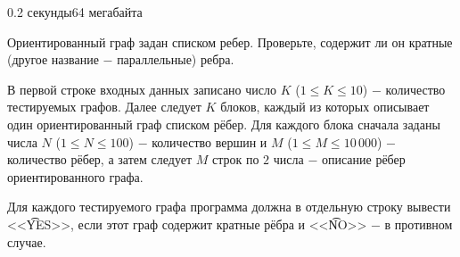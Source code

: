 \begin{problem}{}{}{}{0.2 секунды}{64 мегабайта}

Ориентированный граф задан списком ребер. 
Проверьте, содержит ли он кратные (другое название $-$ параллельные) ребра.

\InputFile
В первой строке входных данных записано число $K$ ($1 \le K \le 10$) $-$ количество тестируемых графов. 
Далее следует $K$ блоков, каждый из которых описывает один ориентированный граф списком рёбер. 
Для каждого блока сначала заданы числа $N$ ($1 \le N \le 100$) $-$ количество вершин и $M$ ($1 \le M \le 10\,000$) $-$
количество рёбер, а затем следует $M$ строк по $2$ числа $-$ описание рёбер ориентированного графа.

\OutputFile
Для каждого тестируемого графа программа должна в отдельную строку вывести <<{\t{YES}}>>, если этот граф
содержит кратные рёбра и <<{\t{NO}}>> $-$ в противном случае.

\Example

\begin{example}
%
\end{example}

\end{problem}

